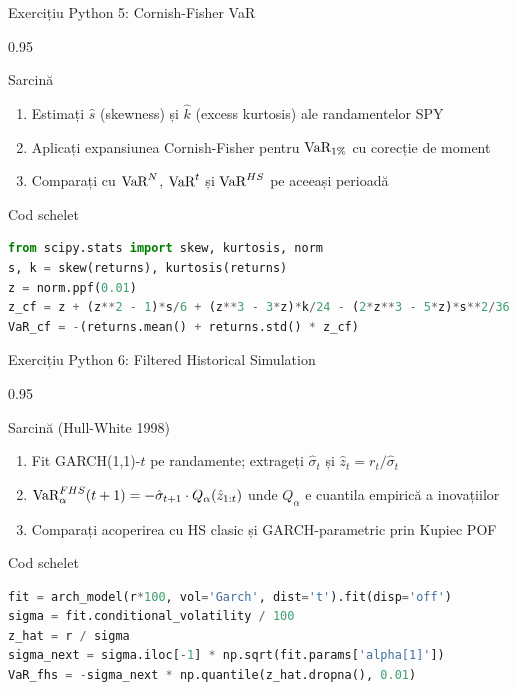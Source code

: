 \documentclass[9pt, aspectratio=169, t]{beamer}
\begin{document}
\begin{frame}[fragile,shrink=10]{Exercițiu Python 5: Cornish-Fisher VaR}
\begin{cminipage}{0.95\textwidth}
    \begin{block}{Sarcină}
    \begin{enumerate}\setlength{\itemsep}{0pt}
        \item Estimați $\hat{s}$ (skewness) și $\hat{k}$ (excess kurtosis) ale randamentelor SPY
        \item Aplicați expansiunea Cornish-Fisher pentru $\text{VaR}_{1\%}$ cu corecție de moment
        \item Comparați cu $\text{VaR}^N$, $\text{VaR}^t$ și $\text{VaR}^{HS}$ pe aceeași perioadă
    \end{enumerate}
    \end{block}
    \begin{exampleblock}{Cod schelet}
\begin{lstlisting}[language=Python]
from scipy.stats import skew, kurtosis, norm
s, k = skew(returns), kurtosis(returns)
z = norm.ppf(0.01)
z_cf = z + (z**2 - 1)*s/6 + (z**3 - 3*z)*k/24 - (2*z**3 - 5*z)*s**2/36
VaR_cf = -(returns.mean() + returns.std() * z_cf)
\end{lstlisting}
    \end{exampleblock}
\end{cminipage}
\end{frame}

\begin{frame}[fragile,shrink=10]{Exercițiu Python 6: Filtered Historical Simulation}
\begin{cminipage}{0.95\textwidth}
    \begin{block}{Sarcină (Hull-White 1998)}
    \begin{enumerate}\setlength{\itemsep}{0pt}
        \item Fit GARCH(1,1)-$t$ pe randamente; extrageți $\hat{\sigma}_t$ și $\hat{z}_t = r_t/\hat{\sigma}_t$
        \item $\text{VaR}^{FHS}_\alpha(t+1) = -\hat{\sigma}_{t+1} \cdot Q_\alpha(\hat{z}_{1:t})$ unde $Q_\alpha$ e cuantila empirică a inovațiilor
        \item Comparați acoperirea cu HS clasic și GARCH-parametric prin Kupiec POF
    \end{enumerate}
    \end{block}
    \begin{exampleblock}{Cod schelet}
\begin{lstlisting}[language=Python]
fit = arch_model(r*100, vol='Garch', dist='t').fit(disp='off')
sigma = fit.conditional_volatility / 100
z_hat = r / sigma
sigma_next = sigma.iloc[-1] * np.sqrt(fit.params['alpha[1]'])
VaR_fhs = -sigma_next * np.quantile(z_hat.dropna(), 0.01)
\end{lstlisting}
    \end{exampleblock}
\end{cminipage}
\end{frame}
\end{document}
